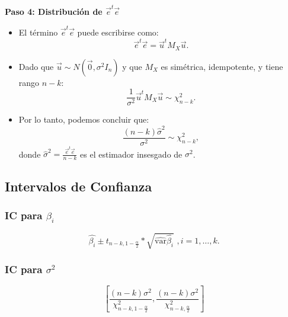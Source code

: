 \documentclass[a4paper,12pt]{article}
\newcommand{\ecuacion}[1]{\ensuremath{#1}}
\begin{document}
\textbf{Paso 4: Distribución de \( \vec{e}^t \vec{e} \)}
\begin{itemize}
    \item El término \( \vec{e}^t \vec{e} \) puede escribirse como:
    \[
    \vec{e}^t \vec{e} = \vec{u}^t M_X \vec{u}.
    \]
    \item Dado que \( \vec{u} \sim N(\vec{0}, \sigma^2 I_n) \) y que \( M_X \) es simétrica, idempotente, y tiene rango \( n-k \):
    \[
    \frac{1}{\sigma^2} \vec{u}^t M_X \vec{u} \sim \chi^2_{n-k}.
    \]
    \item Por lo tanto, podemos concluir que:
    \[
    \frac{(n-k) \hat{\sigma}^2}{\sigma^2} \sim \chi^2_{n-k},
    \]
    donde \( \hat{\sigma}^2 = \frac{\vec{e}^t \vec{e}}{n-k} \) es el estimador insesgado de \( \sigma^2 \).
\end{itemize}

\subsection{Intervalos de Confianza}

\subsubsection{IC para \ecuacion{\beta_i}}

\begin{equation}
    \hat{\beta_i} \pm t_{n-k,1-\frac{\alpha}{2}} * \sqrt{\hat{\text{var}}\hat{\beta_i}}\,\,, i = 1, \ldots, k.
\end{equation}

\subsubsection{IC para \ecuacion{\sigma^2}}

\begin{equation}
    \left[\frac{(n-k)\sigma^2}{\chi_{n-k,1-\frac{\alpha}{2}}^2},\frac{(n-k)\sigma^2}{\chi_{n-k,\frac{\alpha}{2}}^2}\right]
\end{equation}


\end{document}
